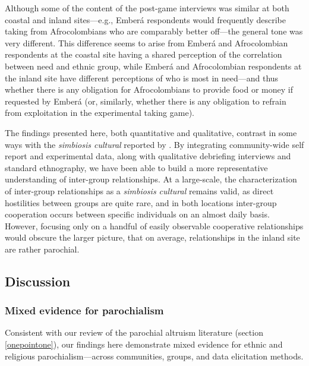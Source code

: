 \documentclass[bibauthoryear]{aa}
\begin{document}
Although some of the content of the post-game interviews was similar at both coastal and inland sites---e.g., Ember\'a respondents would frequently describe taking from Afrocolombians who are comparably better off---the general tone was very different. This difference seems to arise from Ember\'a and Afrocolombian respondents at the coastal site having a shared perception of the correlation between need and ethnic group, while Ember\'a and Afrocolombian respondents at the inland site have different perceptions of who is most in need---and thus whether there is any obligation for Afrocolombians to provide food or money if requested by Ember\'a (or, similarly, whether there is any obligation to refrain from exploitation in the experimental taking game).  

The findings presented here, both quantitative and qualitative, contrast in some ways with the \textit{simbiosis cultural} reported by \citet{Cay73}. By integrating community-wide self report and experimental data, along with qualitative debriefing interviews and standard ethnography, we have been able to build
a more representative understanding of inter-group relationships. At a large-scale, the characterization of inter-group relationships as a \textit{simbiosis cultural} remains valid, as direct hostilities between groups are quite rare, and in both locations inter-group cooperation occurs between specific individuals on an almost daily basis. However, focusing only on a handful of easily observable cooperative relationships would obscure the larger picture, that on average, relationships in the inland site are rather parochial.
  

\subsection{Discussion}
\subsubsection{Mixed evidence for  parochialism}

Consistent with our review of the parochial altruism literature (section \ref{onepointone}), our findings here demonstrate mixed evidence for ethnic and religious parochialism---across communities, groups, and data elicitation methods. %
\end{document}
